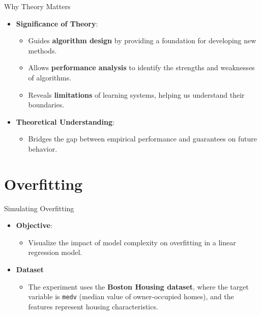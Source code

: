 \documentclass[
  ignorenonframetext,
]{beamer}
\providecommand{\tightlist}{%
  \setlength{\itemsep}{0pt}\setlength{\parskip}{0pt}}\usepackage{longtable,booktabs,array}
\begin{document}
\begin{frame}{Why Theory Matters}
\label{why-theory-matters}
\begin{itemize}
\tightlist
\item
  \textbf{Significance of Theory}:

  \begin{itemize}
  \tightlist
  \item
    Guides \textbf{algorithm design} by providing a foundation for
    developing new methods.
  \item
    Allows \textbf{performance analysis} to identify the strengths and
    weaknesses of algorithms.
  \item
    Reveals \textbf{limitations} of learning systems, helping us
    understand their boundaries.
  \end{itemize}
\item
  \textbf{Theoretical Understanding}:

  \begin{itemize}
  \tightlist
  \item
    Bridges the gap between empirical performance and guarantees on
    future behavior.
  \end{itemize}
\end{itemize}
\end{frame}

\section{Overfitting}\label{overfitting}

\begin{frame}[fragile]{Simulating Overfitting}
\label{simulating-overfitting}
\begin{itemize}
\tightlist
\item
  \textbf{Objective}:

  \begin{itemize}
  \tightlist
  \item
    Visualize the impact of model complexity on overfitting in a linear
    regression model.
  \end{itemize}
\item
  \textbf{Dataset}

  \begin{itemize}
  \tightlist
  \item
    The experiment uses the \textbf{Boston Housing dataset}, where the
    target variable is \texttt{medv} (median value of owner-occupied
    homes), and the features represent housing characteristics.
  \end{itemize}
\end{itemize}
\end{frame}
\end{document}
